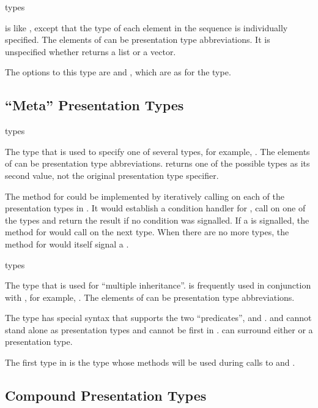  {\rest types}

 is like , except that the type of each
element in the sequence is individually specified.  The elements of 
can be presentation type abbreviations.  It is unspecified whether 
returns a list or a vector.

The options to this type are  and , which are as
for the  type.


\subsection {``Meta'' Presentation Types}

 {\rest types}

The type that is used to specify one of several types, for example, .  The elements of  can be presentation
type abbreviations.   returns one of the possible types as its second
value, not the original  presentation type specifier.

The  method for  could be implemented by iteratively calling
 on each of the presentation types in .  It would
establish a condition handler for , call  on one of
the types and return the result if no condition was signalled.  If a
 is signalled, the  method for  would call
 on the next type.  When there are no more types, the 
method for  would itself signal a .


 {\rest types}

The type that is used for ``multiple inheritance''.   is frequently used
in conjunction with , for example, .  The elements of  can be presentation type abbreviations.

The  type has special syntax that supports the two ``predicates'',
 and .   and  cannot stand alone as
presentation types and cannot be first in .   can surround
either  or a presentation type.

The first type in  is the type whose methods will be used during
calls to  and .


\subsection {Compound Presentation Types}

